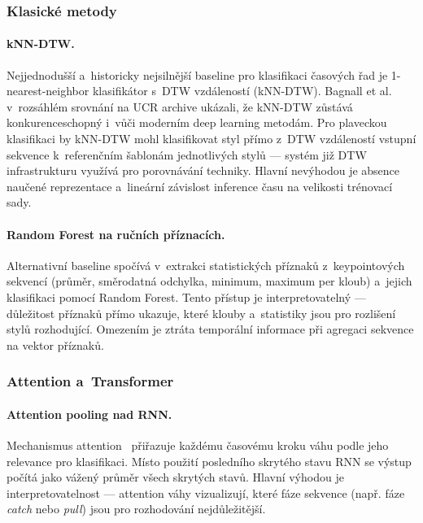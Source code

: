 \subsubsection{Klasické metody}
\label{subsubsec:klasicke}

\paragraph{kNN-DTW.}
Nejjednodušší a~historicky nejsilnější baseline pro klasifikaci časových řad je 1-nearest-neighbor klasifikátor s~DTW vzdáleností (kNN-DTW). Bagnall et al.~\cite{bagnall2017bakeoff} v~rozsáhlém srovnání na UCR archive ukázali, že kNN-DTW zůstává konkurenceschopný i~vůči moderním deep learning metodám. Pro plaveckou klasifikaci by kNN-DTW mohl klasifikovat styl přímo z~DTW vzdáleností vstupní sekvence k~referenčním šablonám jednotlivých stylů --- systém již DTW infrastrukturu využívá pro porovnávání techniky. Hlavní nevýhodou je absence naučené reprezentace a~lineární závislost inference času na velikosti trénovací sady.

\paragraph{Random Forest na ručních příznacích.}
Alternativní baseline spočívá v~extrakci statistických příznaků z~keypointových sekvencí (průměr, směrodatná odchylka, minimum, maximum per kloub) a~jejich klasifikaci pomocí Random Forest. Tento přístup je interpretovatelný --- důležitost příznaků přímo ukazuje, které klouby a~statistiky jsou pro rozlišení stylů rozhodující. Omezením je ztráta temporální informace při agregaci sekvence na vektor příznaků.

\subsubsection{Attention a~Transformer}
\label{subsubsec:attention}

\paragraph{Attention pooling nad RNN.}
Mechanismus attention~\cite{bahdanau2015attention} přiřazuje každému časovému kroku váhu podle jeho relevance pro klasifikaci. Místo použití posledního skrytého stavu RNN se výstup počítá jako vážený průměr všech skrytých stavů. Hlavní výhodou je interpretovatelnost --- attention váhy vizualizují, které fáze sekvence (např. fáze \textit{catch} nebo \textit{pull}) jsou pro rozhodování nejdůležitější.

